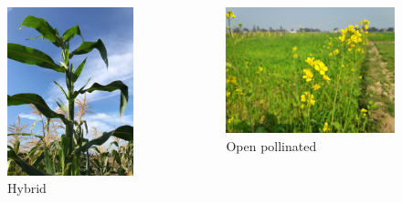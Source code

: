 \documentclass[11pt,ignorenonframetext,aspectratio=169]{beamer}
\begin{document}
\begin{frame}{}
\protect\hypertarget{section-18}{}
\begin{columns}[T,onlytextwidth]
  
  \footnotesize

\begin{figure}
\includegraphics[width=0.6\linewidth]{./images/Teosinte_maize_hybrid_cross} \caption{Hybrid}\label{fig:hybrid}
\end{figure}

  \footnotesize
  
\begin{figure}
\includegraphics[width=0.8\linewidth]{./images/cross_pollinated_mustard} \caption{Open pollinated}\label{fig:openpollinated}
\end{figure}

\end{columns}
\end{frame}
\end{document}
